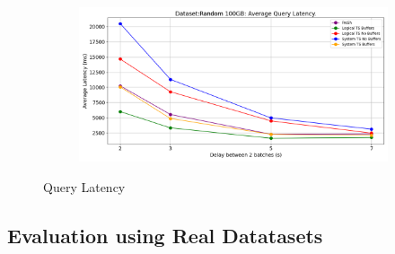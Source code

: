 \begin{figure}
	\centering
	\begin{subfigure}[c]{0.6\textwidth}
		\includegraphics[width=1\textwidth]   {figures/Experiments/Dynamic/Latency/average_latency.png}
		\label{fig:average-latency}
	\end{subfigure}
	\caption{Query Latency}
	\label{fig:latency-random}
\end{figure}

\clearpage
\subsection{Evaluation using Real Datatasets}